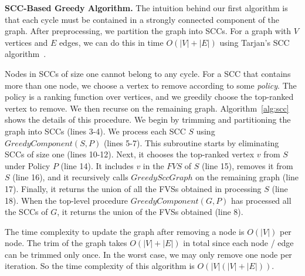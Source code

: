 \begin{algorithm}[t]
\SetAlgoLined\DontPrintSemicolon
{}
\caption{Sort-based greedy algorithm}
\label{alg:sort}
\end{algorithm}




{\bf SCC-Based Greedy Algorithm.} The intuition behind our first algorithm is that each cycle must be contained in a strongly connected component of the graph. After preprocessing, we partition the graph into SCCs. For a graph with $V$ vertices and $E$ edges, we can do this in time $O(|V|+|E|)$ using Tarjan's SCC algorithm~\cite{tarjan1972depth}.

Nodes in SCCs of size one cannot belong to any cycle. For a SCC that contains
more than one node, we choose a vertex to remove according to some \emph{policy}. The policy is a ranking function over vertices, and we greedily choose the top-ranked vertex to remove. We then recurse on the remaining graph. Algorithm~\ref{alg:scc} shows the details of this procedure. We begin by trimming and partitioning the graph into SCCs  (lines 3-4). We process each SCC $S$ using $GreedyComponent(S, P)$ (lines 5-7). This subroutine starts by eliminating SCCs of size one (lines 10-12). Next, it chooses the top-ranked vertex $v$ from $S$ under Policy $P$ (line 14). It includes $v$ in the $FVS$ of $S$ (line 15), removes it from $S$ (line 16), and it recursively calls $GreedySccGraph$ on the remaining graph (line 17). Finally, it returns the union of all the FVSs obtained in processing $S$ (line 18). When the top-level procedure $GreedyComponent(G, P)$ has processed all the SCCs of $G$, it returns the union of the FVSs obtained (line 8).

The time complexity to update the graph after removing a node is $O(|V|)$ per node. The trim of the graph takes $O(|V| + |E|)$ in total since each node / edge can be trimmed only once. In the worst case, we may only remove one node per iteration. So the time complexity of this algorithm is $O(|V|(|V|+|E|))$.

